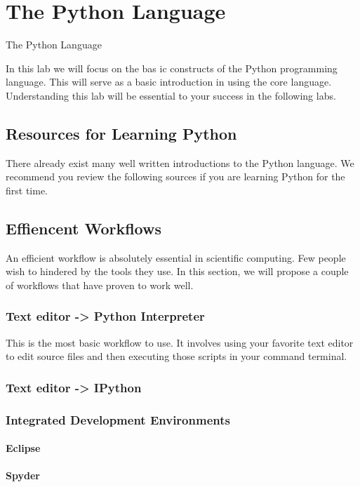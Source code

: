 \chapter{The Python Language}{The Python Language}
\label{Lab:Python}

In this lab we will focus on the bas ic constructs of the Python programming language.  This will serve as a basic introduction in using the core language.  Understanding this lab will be essential to your success in the following labs.

\section*{Resources for Learning Python}
There already exist many well written introductions to the Python language.  We recommend you review the following sources if you are learning Python for the first time.


\section*{Effiencent Workflows}
An efficient workflow is absolutely essential in scientific computing.  Few people wish to hindered by the tools they use.  In this section, we will propose a couple of workflows that have proven to work well.

\subsection*{Text editor -> Python Interpreter}
This is the most basic workflow to use.  It involves using your favorite text editor to edit source files and then executing those scripts in your command terminal.

\subsection*{Text editor -> IPython}
\subsection*{Integrated Development Environments}
\subsubsection*{Eclipse}
\subsubsection*{Spyder}

